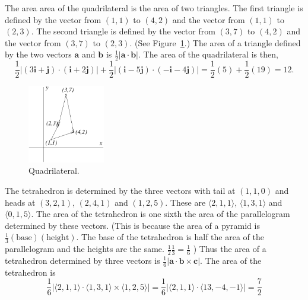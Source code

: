 {%
\begin{Solution}
\label{solution area quadrilateral 11 42 37 23}
The area area of the quadrilateral is the area of two triangles.  The first
triangle is defined by the vector from $(1,1)$ to $(4,2)$ and the vector
from $(1,1)$ to $(2,3)$.  The second triangle is defined by the vector from
$(3,7)$ to $(4,2)$ and the vector from $(3,7)$ to $(2,3)$. 
(See Figure~\ref{quad}.)
The area of a triangle defined by the two vectors $\mathbf{a}$ and 
$\mathbf{b}$ is $\frac{1}{2} | \mathbf{a} \cdot \mathbf{b} |$.
The area of the quadrilateral is then,
\[
\frac{1}{2} |(3 \mathbf{i} + \mathbf{j} ) \cdot ( \mathbf{i} + 2 \mathbf{j} )|
+ \frac{1}{2} |(\mathbf{i} - 5 \mathbf{j}) \cdot (-\mathbf{i} - 4 \mathbf{j} )|
= \frac{1}{2} (5) + \frac{1}{2} (19)
= 12.
\]

\begin{figure}[htb!]
\begin{center}
  \includegraphics[width=0.3\textwidth]{algebra/vectors/quad}
\end{center}
\caption{Quadrilateral.}
\label{quad}
\end{figure}
\end{Solution}



\begin{Solution}
\label{solution volume tetrahedron 110 321 241 125}
The tetrahedron is determined by the three vectors with tail at $(1,1,0)$
and heads at $(3,2,1)$, $(2,4,1)$ and $(1,2,5)$.  These are
$\langle 2,1,1 \rangle$, $\langle 1,3,1 \rangle$ and $\langle 0,1,5 \rangle$.  The area of the
tetrahedron is one sixth the area of the parallelogram determined by
these vectors.  (This is because the area of a pyramid is 
$\frac{1}{3} (\mathrm{base})(\mathrm{height})$.  The base of the tetrahedron is
half the area of the parallelogram and the heights are the same.
$\frac{1}{2} \frac{1}{3} = \frac{1}{6}$ )
Thus the area of a tetrahedron determined by three
vectors is $\frac{1}{6} | \mathbf{a} \cdot \mathbf{b} \times \mathbf{c} |$.
The area of the tetrahedron is
\[
\frac{1}{6} \left| \langle 2,1,1 \rangle \cdot \langle 1,3,1 \rangle \times \langle 1,2,5 \rangle 
        \right|
= \frac{1}{6} \left| \langle 2,1,1 \rangle \cdot \langle 13,-4,-1 \rangle \right|
= \frac{7}{2} 
\]
\end{Solution}


}

